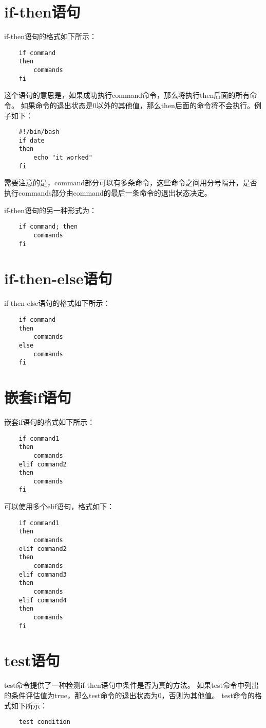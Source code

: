 \documentclass[a4paper,left=2.5cm,right=2.5cm,11pt]{article}
\begin{document}
\tableofcontents

\clearpage

\section{if-then语句}
	if-then语句的格式如下所示：
	\begin{lstlisting}
	if command
	then
		commands
	fi
	\end{lstlisting}

	这个语句的意思是，如果成功执行command命令，那么将执行then后面的所有命令。
	如果命令的退出状态是0以外的其他值，那么then后面的命令将不会执行。例子如下：
	\begin{lstlisting}
	#!/bin/bash
	if date
	then
		echo "it worked"
	fi
	\end{lstlisting}

	需要注意的是，command部分可以有多条命令，这些命令之间用分号隔开，是否执行commands部分由command的最后一条命令的退出状态决定。\par

	if-then语句的另一种形式为：
	\begin{lstlisting}
	if command; then
		commands
	fi
	\end{lstlisting}

\section{if-then-else语句}
	if-then-else语句的格式如下所示：
	\begin{lstlisting}
	if command
	then
		commands
	else
		commands
	fi
	\end{lstlisting}

\section{嵌套if语句}
	嵌套if语句的格式如下所示：
	\begin{lstlisting}
	if command1
	then
		commands
	elif command2
	then
		commands
	fi
	\end{lstlisting}

	可以使用多个elif语句，格式如下：
	\begin{lstlisting}
	if command1
	then
		commands
	elif command2
	then
		commands
	elif command3
	then
		commands
	elif command4
	then
		commands
	fi
	\end{lstlisting}

\section{test语句}
	test命令提供了一种检测if-then语句中条件是否为真的方法。
	如果test命令中列出的条件评估值为true，那么test命令的退出状态为0，否则为其他值。
	test命令的格式如下所示：
	\begin{lstlisting}
	test condition
	\end{lstlisting}
\end{document}
